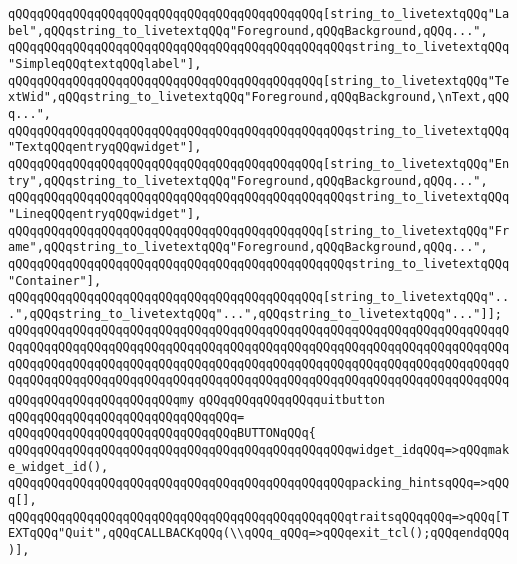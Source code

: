 \verb|qQQqqQQqqQQqqQQqqQQqqQQqqQQqqQQqqQQqqQQqqQQq[string_to_livetextqQQq"Label",qQQqstring_to_livetextqQQq"Foreground,qQQqBackground,qQQq...",|\newline
\verb|qQQqqQQqqQQqqQQqqQQqqQQqqQQqqQQqqQQqqQQqqQQqqQQqstring_to_livetextqQQq"SimpleqQQqtextqQQqlabel"],|\newline
\verb|qQQqqQQqqQQqqQQqqQQqqQQqqQQqqQQqqQQqqQQqqQQq[string_to_livetextqQQq"TextWid",qQQqstring_to_livetextqQQq"Foreground,qQQqBackground,\nText,qQQq...",|\newline
\verb|qQQqqQQqqQQqqQQqqQQqqQQqqQQqqQQqqQQqqQQqqQQqqQQqstring_to_livetextqQQq"TextqQQqentryqQQqwidget"],|\newline
\verb|qQQqqQQqqQQqqQQqqQQqqQQqqQQqqQQqqQQqqQQqqQQq[string_to_livetextqQQq"Entry",qQQqstring_to_livetextqQQq"Foreground,qQQqBackground,qQQq...",|\newline
\verb|qQQqqQQqqQQqqQQqqQQqqQQqqQQqqQQqqQQqqQQqqQQqqQQqstring_to_livetextqQQq"LineqQQqentryqQQqwidget"],|\newline
\verb|qQQqqQQqqQQqqQQqqQQqqQQqqQQqqQQqqQQqqQQqqQQq[string_to_livetextqQQq"Frame",qQQqstring_to_livetextqQQq"Foreground,qQQqBackground,qQQq...",|\newline
\verb|qQQqqQQqqQQqqQQqqQQqqQQqqQQqqQQqqQQqqQQqqQQqqQQqstring_to_livetextqQQq"Container"],|\newline
\verb|qQQqqQQqqQQqqQQqqQQqqQQqqQQqqQQqqQQqqQQqqQQq[string_to_livetextqQQq"...",qQQqstring_to_livetextqQQq"...",qQQqstring_to_livetextqQQq"..."]];|\newline
\verb|qQQqqQQqqQQqqQQqqQQqqQQqqQQqqQQqqQQqqQQqqQQqqQQqqQQqqQQqqQQqqQQqqQQqqQQqqQQqqQQqqQQqqQQqqQQqqQQqqQQqqQQqqQQqqQQqqQQqqQQqqQQqqQQqqQQqqQQqqQQqqQQqqQQqqQQqqQQqqQQqqQQqqQQqqQQqqQQqqQQqqQQqqQQqqQQqqQQqqQQqqQQqqQQqqQQqqQQqqQQqqQQqqQQqqQQqqQQqqQQqqQQqqQQqqQQqqQQqqQQqqQQqqQQqqQQqqQQqqQQqqQQqqQQqqQQqqQQqqQQqqQQqmy|\newline
\verb|qQQqqQQqqQQqqQQqquitbutton|\newline
\verb|qQQqqQQqqQQqqQQqqQQqqQQqqQQqqQQq=|\newline
\verb|qQQqqQQqqQQqqQQqqQQqqQQqqQQqqQQqBUTTONqQQq{|\newline
\verb|qQQqqQQqqQQqqQQqqQQqqQQqqQQqqQQqqQQqqQQqqQQqqQQqwidget_idqQQq=>qQQqmake_widget_id(),|\newline
\verb|qQQqqQQqqQQqqQQqqQQqqQQqqQQqqQQqqQQqqQQqqQQqqQQqpacking_hintsqQQq=>qQQq[],|\newline
\verb|qQQqqQQqqQQqqQQqqQQqqQQqqQQqqQQqqQQqqQQqqQQqqQQqtraitsqQQqqQQq=>qQQq[TEXTqQQq"Quit",qQQqCALLBACKqQQq(\\qQQq_qQQq=>qQQqexit_tcl();qQQqendqQQq)],|\newline
